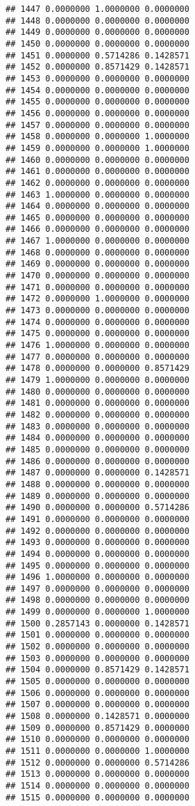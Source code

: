 \documentclass[
]{article}
\begin{document}
\begin{verbatim}
## 1447 0.0000000 1.0000000 0.0000000
## 1448 0.0000000 0.0000000 0.0000000
## 1449 0.0000000 0.0000000 0.0000000
## 1450 0.0000000 0.0000000 0.0000000
## 1451 0.0000000 0.5714286 0.1428571
## 1452 0.0000000 0.8571429 0.1428571
## 1453 0.0000000 0.0000000 0.0000000
## 1454 0.0000000 0.0000000 0.0000000
## 1455 0.0000000 0.0000000 0.0000000
## 1456 0.0000000 0.0000000 0.0000000
## 1457 0.0000000 0.0000000 0.0000000
## 1458 0.0000000 0.0000000 1.0000000
## 1459 0.0000000 0.0000000 1.0000000
## 1460 0.0000000 0.0000000 0.0000000
## 1461 0.0000000 0.0000000 0.0000000
## 1462 0.0000000 0.0000000 0.0000000
## 1463 1.0000000 0.0000000 0.0000000
## 1464 0.0000000 0.0000000 0.0000000
## 1465 0.0000000 0.0000000 0.0000000
## 1466 0.0000000 0.0000000 0.0000000
## 1467 1.0000000 0.0000000 0.0000000
## 1468 0.0000000 0.0000000 0.0000000
## 1469 0.0000000 0.0000000 0.0000000
## 1470 0.0000000 0.0000000 0.0000000
## 1471 0.0000000 0.0000000 0.0000000
## 1472 0.0000000 1.0000000 0.0000000
## 1473 0.0000000 0.0000000 0.0000000
## 1474 0.0000000 0.0000000 0.0000000
## 1475 0.0000000 0.0000000 0.0000000
## 1476 1.0000000 0.0000000 0.0000000
## 1477 0.0000000 0.0000000 0.0000000
## 1478 0.0000000 0.0000000 0.8571429
## 1479 1.0000000 0.0000000 0.0000000
## 1480 0.0000000 0.0000000 0.0000000
## 1481 0.0000000 0.0000000 0.0000000
## 1482 0.0000000 0.0000000 0.0000000
## 1483 0.0000000 0.0000000 0.0000000
## 1484 0.0000000 0.0000000 0.0000000
## 1485 0.0000000 0.0000000 0.0000000
## 1486 0.0000000 0.0000000 0.0000000
## 1487 0.0000000 0.0000000 0.1428571
## 1488 0.0000000 0.0000000 0.0000000
## 1489 0.0000000 0.0000000 0.0000000
## 1490 0.0000000 0.0000000 0.5714286
## 1491 0.0000000 0.0000000 0.0000000
## 1492 0.0000000 0.0000000 0.0000000
## 1493 0.0000000 0.0000000 0.0000000
## 1494 0.0000000 0.0000000 0.0000000
## 1495 0.0000000 0.0000000 0.0000000
## 1496 1.0000000 0.0000000 0.0000000
## 1497 0.0000000 0.0000000 0.0000000
## 1498 0.0000000 0.0000000 0.0000000
## 1499 0.0000000 0.0000000 1.0000000
## 1500 0.2857143 0.0000000 0.1428571
## 1501 0.0000000 0.0000000 0.0000000
## 1502 0.0000000 0.0000000 0.0000000
## 1503 0.0000000 0.0000000 0.0000000
## 1504 0.0000000 0.8571429 0.1428571
## 1505 0.0000000 0.0000000 0.0000000
## 1506 0.0000000 0.0000000 0.0000000
## 1507 0.0000000 0.0000000 0.0000000
## 1508 0.0000000 0.1428571 0.0000000
## 1509 0.0000000 0.8571429 0.0000000
## 1510 0.0000000 0.0000000 0.0000000
## 1511 0.0000000 0.0000000 1.0000000
## 1512 0.0000000 0.0000000 0.5714286
## 1513 0.0000000 0.0000000 0.0000000
## 1514 0.0000000 0.0000000 0.0000000
## 1515 0.0000000 0.0000000 0.0000000

\end{verbatim}
\end{document}
